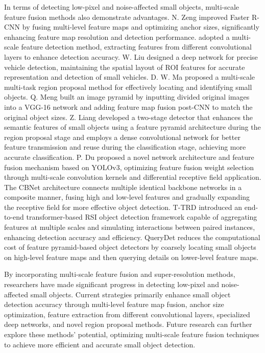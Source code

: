 \documentclass[journal]{IEEEtran}
\begin{document}
In terms of detecting low-pixel and noise-affected small objects, multi-scale feature fusion methods also demonstrate advantages. N. Zeng\cite{zeng2022small} improved Faster R-CNN\cite{ren2016faster} by fusing multi-level feature maps and optimizing anchor sizes, significantly enhancing feature map resolution and detection performance. \cite{hu2018small} adopted a multi-scale feature detection method, extracting features from different convolutional layers to enhance detection accuracy. W. Liu\cite{liu2018improving} designed a deep network for precise vehicle detection, maintaining the spatial layout of ROI features for accurate representation and detection of small vehicles. D. W. Ma\cite{ma2019efficient} proposed a multi-scale multi-task region proposal method for effectively locating and identifying small objects. Q. Meng\cite{meng2019block} built an image pyramid by inputting divided original images into a VGG-16 network\cite{simonyan2014very} and adding feature map fusion post-CNN to match the original object sizes. Z. Liang\cite{liang2018small} developed a two-stage detector that enhances the semantic features of small objects using a feature pyramid architecture during the region proposal stage and employs a dense convolutional network for better feature transmission and reuse during the classification stage, achieving more accurate classification. P. Du\cite{du2018research}  proposed a novel network architecture and feature fusion mechanism based on YOLOv3, optimizing feature fusion weight selection through multi-scale convolution kernels and differential receptive field application. The CBNet\cite{liang2022cbnet} architecture connects multiple identical backbone networks in a composite manner, fusing high and low-level features and gradually expanding the receptive field for more effective object detection. T-TRD\cite{li2022transformer} introduced an end-to-end transformer-based RSI object detection framework capable of aggregating features at multiple scales and simulating interactions between paired instances, enhancing detection accuracy and efficiency. QueryDet\cite{yang2022querydet} reduces the computational cost of feature pyramid-based object detectors by coarsely locating small objects on high-level feature maps and then querying details on lower-level feature maps.

By incorporating multi-scale feature fusion and super-resolution methods, researchers have made significant progress in detecting low-pixel and noise-affected small objects. Current strategies primarily enhance small object detection accuracy through multi-level feature map fusion, anchor size optimization, feature extraction from different convolutional layers, specialized deep networks, and novel region proposal methods. Future research can further explore these methods' potential, optimizing multi-scale feature fusion techniques to achieve more efficient and accurate small object detection.
\end{document}
